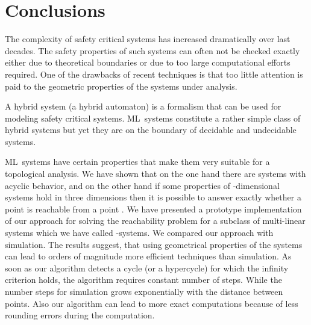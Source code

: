 \documentclass[copyright,creativecommons]{packages/eptcs}
\newcommand{\ml}{\mbox{ML}}
\begin{document}
\section{Conclusions}\label{sec:conclusions}

The complexity of safety critical systems has increased dramatically over last decades. 
The safety properties of such systems  can often not be checked exactly  either due to theoretical boundaries or due to too large
computational efforts required. One of the drawbacks of recent techniques is that too little attention is paid to the geometric properties of the systems under analysis.

A hybrid system (a hybrid automaton) is a formalism that can be used  for modeling safety critical systems. \ml~systems constitute a rather simple class of hybrid systems but yet they are on the boundary of decidable and undecidable systems.  

\ml~systems have certain properties that make them very suitable for a topological analysis. 
 We have shown that on the one hand there are systems with acyclic behavior, and on the other hand if
some properties of -dimensional systems hold in three dimensions then it is possible to answer  exactly  whether a point  is reachable from a point .   
We have presented a prototype implementation of our approach for solving the reachability problem for a subclass of multi-linear systems which we have called -systems.
We compared our approach  with simulation. The results  suggest, that using geometrical properties of the systems can lead  to  orders of magnitude more efficient techniques than simulation.
As soon as our algorithm detects a cycle (or a hypercycle) for which the infinity criterion holds, the algorithm requires constant number of steps. While the number steps for simulation grows exponentially with the distance between points. 
Also  our algorithm can lead to more exact computations because of  less rounding errors during the computation. 








\end{document}
